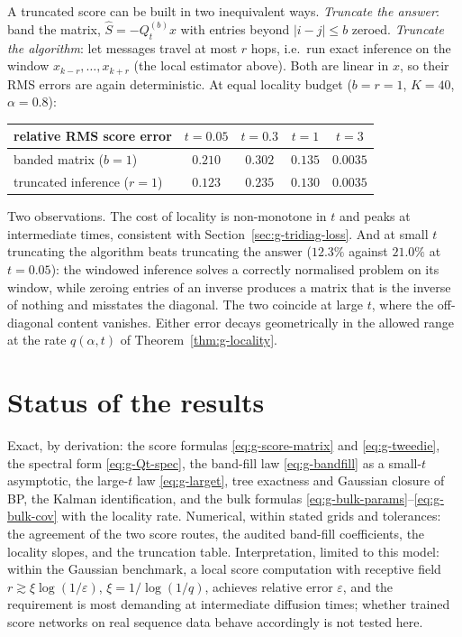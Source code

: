 A truncated score can be built in two inequivalent ways.
\emph{Truncate the answer}: band the matrix,
$\widehat S = -Q_t^{(b)} x$ with entries beyond $|i-j| \leq b$ zeroed.
\emph{Truncate the algorithm}: let messages travel at most $r$ hops, i.e.\
run exact inference on the window $x_{k-r}, \dots, x_{k+r}$ (the local
estimator above). Both are linear in $x$, so their RMS errors are again
deterministic. At equal locality budget ($b = r = 1$, $K = 40$,
$\alpha = 0.8$):
\begin{center}
\begin{tabular}{@{}lcccc@{}}
\toprule
relative RMS score error & $t = 0.05$ & $t = 0.3$ & $t = 1$ & $t = 3$ \\
\midrule
banded matrix ($b = 1$)      & $0.210$ & $0.302$ & $0.135$ & $0.0035$ \\
truncated inference ($r = 1$) & $0.123$ & $0.235$ & $0.130$ & $0.0035$ \\
\bottomrule
\end{tabular}
\end{center}
Two observations. The cost of locality is non-monotone in $t$ and peaks at
intermediate times, consistent with Section~\ref{sec:g-tridiag-loss}. And
at small $t$ truncating the algorithm beats truncating the answer
($12.3\%$ against $21.0\%$ at $t = 0.05$): the windowed inference solves a
correctly normalised problem on its window, while zeroing entries of an
inverse produces a matrix that is the inverse of nothing and misstates the
diagonal. The two coincide at large $t$, where the off-diagonal content
vanishes. Either error decays geometrically in the allowed range at the
rate $q(\alpha, t)$ of Theorem~\ref{thm:g-locality}.

\section{Status of the results}\label{sec:g-status}

Exact, by derivation: the score formulas
\eqref{eq:g-score-matrix} and \eqref{eq:g-tweedie}, the spectral form
\eqref{eq:g-Qt-spec}, the band-fill law \eqref{eq:g-bandfill} as a
small-$t$ asymptotic, the large-$t$ law \eqref{eq:g-larget}, tree
exactness and Gaussian closure of BP, the Kalman identification, and the
bulk formulas \eqref{eq:g-bulk-params}--\eqref{eq:g-bulk-cov} with the
locality rate. Numerical, within stated grids and tolerances: the
agreement of the two score routes, the audited band-fill coefficients,
the locality slopes, and the truncation table. Interpretation, limited to
this model: within the Gaussian benchmark, a local score computation with
receptive field $r \gtrsim \xi \log(1/\varepsilon)$,
$\xi = 1/\log(1/q)$, achieves relative error $\varepsilon$, and the
requirement is most demanding at intermediate diffusion times; whether
trained score networks on real sequence data behave accordingly is not
tested here.
